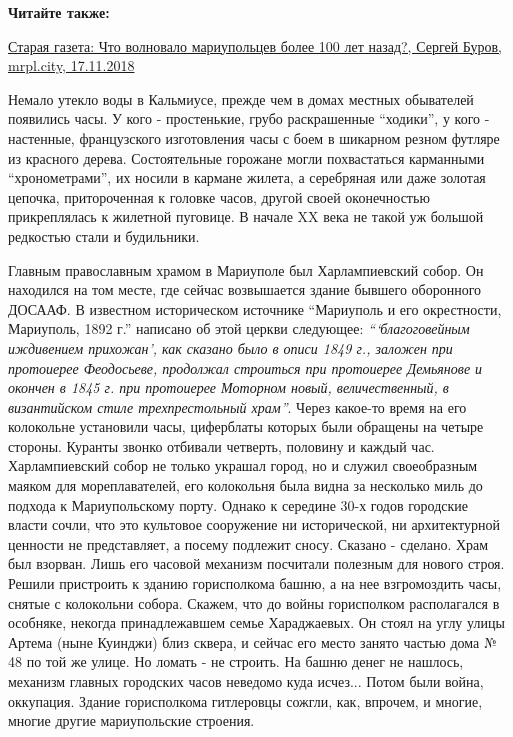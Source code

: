 \textbf{Читайте также:} 

\href{https://archive.org/details/17_11_2018.sergij_burov.mrpl_city.staraja_gazeta_chto_volnovalo_100_let_nazad}{%
Старая газета: Что волновало мариупольцев более 100 лет назад?, Сергей Буров, mrpl.city, 17.11.2018}

Немало утекло воды в Кальмиусе, прежде чем в домах местных обывателей появились
часы. У кого - простенькие, грубо раскрашенные \enquote{ходики}, у кого - настенные,
французского изготовления часы с боем в шикарном резном футляре из красного
дерева. Состоятельные горожане могли похвастаться карманными \enquote{хронометрами}, их
носили в кармане жилета, а серебряная или даже золотая цепочка, притороченная к
головке часов, другой своей оконечностью прикреплялась к жилетной пуговице. В
начале XX века не такой уж большой редкостью стали и будильники.


Главным православным храмом в Мариуполе был Харлампиевский собор. Он находился
на том месте, где сейчас возвышается здание бывшего оборонного ДОСААФ. В
известном историческом источнике \enquote{Мариуполь и его окрестности, Мариуполь, 1892
г.} написано об этой церкви следующее: \emph{\enquote{\enquote{благоговейным иждивением прихожан}, как
сказано было в описи 1849 г., заложен при протоиерее Феодосьеве, продолжал
строиться при протоиерее Демьянове и окончен в 1845 г. при протоиерее Моторном
новый, величественный, в византийском стиле трехпрестольный храм}}. Через
какое-то время на его колокольне установили часы, циферблаты которых были
обращены на четыре стороны. Куранты звонко отбивали четверть, половину и каждый
час. Харлампиевский собор не только украшал город, но и служил своеобразным
маяком для мореплавателей, его колокольня была видна за несколько миль до
подхода к Мариупольскому порту. Однако к середине 30-х годов городские власти
сочли, что это культовое сооружение ни исторической, ни архитектурной ценности
не представляет, а посему подлежит сносу. Сказано - сделано. Храм был взорван.
Лишь его часовой механизм посчитали полезным для нового строя. Решили
пристроить к зданию горисполкома башню, а на нее взгромоздить часы, снятые с
колокольни собора. Скажем, что до войны горисполком располагался в особняке,
некогда принадлежавшем семье Хараджаевых. Он стоял на углу улицы Артема (ныне
Куинджи) близ сквера, и сейчас его место занято частью дома № 48 по той же
улице. Но ломать - не строить. На башню денег не нашлось, механизм главных
городских часов неведомо куда исчез... Потом были война, оккупация. Здание
горисполкома гитлеровцы сожгли, как, впрочем, и многие, многие другие
мариупольские строения.

